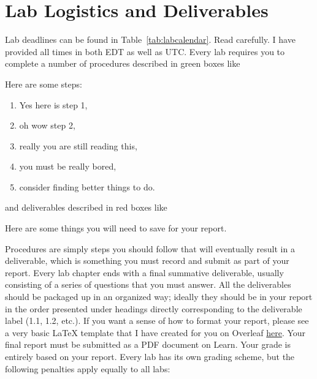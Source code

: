 \section{Lab Logistics and Deliverables}\label{intro:logistics}
Lab deadlines can be found in Table~\ref{tab:labcalendar}. Read carefully.
I have provided all times in both EDT as well as UTC.
Every lab requires you to complete a number of procedures described in
green boxes like
\begin{procedure}[]
  Here are some steps:
  \begin{enumerate}[label=(\arabic*)]
    \item{Yes here is step 1,}
    \item{oh wow step 2,}
    \item{really you are still reading this,}
    \item{you must be really bored,}
    \item{consider finding better things to do.}
  \end{enumerate}
\end{procedure}
\noindent
and deliverables described in red boxes like
\begin{deliverable}[]
  Here are some things you will need to save for your report.
\end{deliverable}
Procedures are simply steps you should follow that will eventually result in
a deliverable, which is something you must record and submit as part of your
report. Every lab chapter ends with a final summative deliverable, usually
consisting of a series of questions that you must answer.
%
All the deliverables should be packaged up in an organized way; ideally
they should be in your report in the order presented under headings directly
corresponding to the deliverable label (1.1, 1.2, etc.). If you want a sense
of how to format your report, please see a very basic LaTeX template that I
have created for you on Overleaf \href{https://www.overleaf.com/read/jnwwfmnvkgpx}{here}.
Your final report must be submitted as a PDF document on Learn.
Your grade is entirely based
on your report. Every lab has its own grading scheme, but the following
penalties apply equally to all labs:
